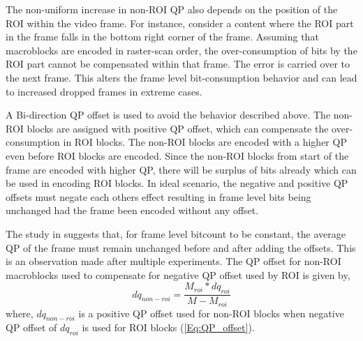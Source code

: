 \documentclass[11pt]{article} %
\begin{document}
The non-uniform increase in non-ROI QP also depends on the position of the ROI within the video frame. For instance, consider a content where the ROI part in the frame falls in the bottom right corner of the frame. Assuming that macroblocks are encoded in raster-scan order, the over-consumption of bits by the ROI part cannot be compensated within that frame. The error is carried over to the next frame. This alters the frame level bit-consumption behavior and can lead to increased dropped frames in extreme cases. 

A Bi-direction QP offset is used to avoid the behavior described above. The non-ROI blocks are assigned with positive QP offset, which can compensate the over-consumption in ROI blocks. The non-ROI blocks are encoded with a higher QP even before ROI blocks are encoded. Since the non-ROI blocks from start of the frame are encoded with higher QP, there will be surplus of bits already which can be used in encoding ROI blocks. In ideal scenario, the negative and positive QP offsets must negate each others effect resulting in frame level bits being unchanged had the frame been encoded without any offset.

The study in \cite{ROI-Coding-paper} suggests that, for frame level bitcount to be constant, the average QP of the frame must remain unchanged before and after adding the offsets. This is an observation made after multiple experiments. The QP offset for non-ROI macroblocks used to compensate for negative QP offset used by ROI is given by,
\begin{equation}
	\label{Eq:QP_offset_double}
		dq_{non-roi} = \frac{M_{roi} * dq_{roi}}{M - M_{roi}}
\end{equation}
where, $dq_{non-roi}$ is a positive QP offset used for non-ROI blocks when negative QP offset of $dq_{roi}$ is used for ROI blocks (\ref{Eq:QP_offset}). 
\end{document}
